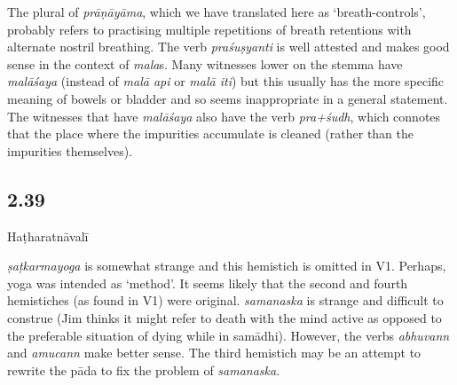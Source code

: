 \begin{ekdosis}
\begin{philcomm}[hp02_038]
The plural of \emph{prāṇāyāma}, which we have translated here as ‘breath-controls’, probably refers to practising multiple repetitions of breath retentions with alternate nostril breathing. The verb \emph{praśuṣyanti} is well attested and makes good sense in the context of \emph{mala}s. Many witnesses lower on the stemma have \emph{malāśaya} (instead of \emph{malā api} or \emph{malā iti}) but this usually has the more specific meaning of bowels or bladder and so seems inappropriate in a general statement. The witnesses that have \emph{malāśaya} also have the verb \emph{pra+śudh}, which connotes that the place where the impurities accumulate is cleaned (rather than the impurities themselves). 
\end{philcomm}

\subsection*{2.39}
\begin{translation}[hp02_039]
\end{translation}

\begin{sources}[hp02_039]
\end{sources}

\begin{testimonia}[hp02_039]
Haṭharatnāvalī

\begin{versinnote}
\end{versinnote}
\end{testimonia}

\begin{philcomm}[hp02_039]
\emph{ṣaṭkarmayoga} is somewhat strange and this hemistich is omitted in V1. Perhaps, yoga was intended as ‘method’. It seems likely that the second and fourth hemistiches (as found in V1) were original. \emph{samanaska} is strange and difficult to construe (Jim thinks it might refer to death with the mind active as opposed to the preferable situation of dying while in samādhi). However, the verbs \emph{abhuvann} and \emph{amucann} make better sense. The third hemistich may be an attempt to rewrite the pāda to fix the problem of \emph{samanaska}.
\end{philcomm}


\end{ekdosis}
